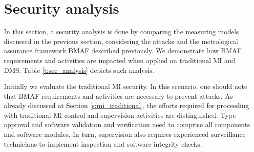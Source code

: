 \documentclass[journal]{IEEEtran}
\begin{document}

\section{Security analysis}
\label{s:sec_analysis}
In this section, a security analysis is done by comparing the measuring models discussed in the previous section, considering the attacks and the metrological assurance framework BMAF described previously. 
We demonstrate how BMAF requirements and activities are impacted when applied on traditional MI and DMS. 
Table \ref{t:sec_analysis} depicts such analysis.

Initially we evaluate the traditional MI security. In this scenario, one should note that BMAF requirements and activities are  necessary to prevent attacks. As already discussed at Section \ref{s:mi_traditional}, the efforts required for proceeding with traditional MI control and supervision activities are distinguished. Type approval and software validation and verification need to comprise all components and software modules. In turn, supervision also requires experienced surveillance technicians to implement inspection and software integrity checks.
\end{document}
